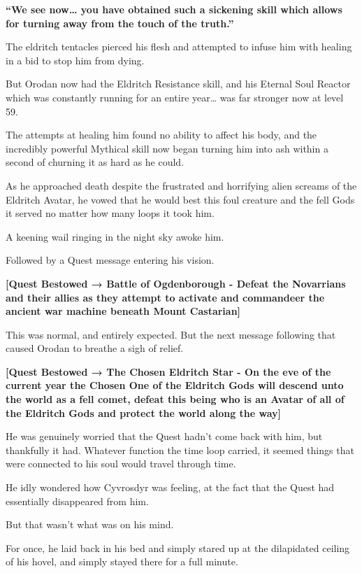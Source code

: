 \documentclass[a4paper,10pt]{book}
\begin{document}
\textbf{“We see now… you have obtained such a sickening skill which allows for turning away from the touch of the truth.”}\par
The eldritch tentacles pierced his flesh and attempted to infuse him with healing in a bid to stop him from dying.\par
But Orodan now had the Eldritch Resistance skill, and his Eternal Soul Reactor which was constantly running for an entire year… was far stronger now at level 59.\par
The attempts at healing him found no ability to affect his body, and the incredibly powerful Mythical skill now began turning him into ash within a second of churning it as hard as he could.\par
As he approached death despite the frustrated and horrifying alien screams of the Eldritch Avatar, he vowed that he would best this foul creature and the fell Gods it served no matter how many loops it took him.\par
\par
A keening wail ringing in the night sky awoke him.\par
Followed by a Quest message entering his vision.\par
\textbf{[Quest Bestowed → Battle of Ogdenborough - Defeat the Novarrians and their allies as they attempt to activate and commandeer the ancient war machine beneath Mount Castarian]}\par
This was normal, and entirely expected. But the next message following that caused Orodan to breathe a sigh of relief.\par
\textbf{[Quest Bestowed → The Chosen Eldritch Star - On the eve of the current year the Chosen One of the Eldritch Gods will descend unto the world as a fell comet, defeat this being who is an Avatar of all of the Eldritch Gods and protect the world along the way]}\par
He was genuinely worried that the Quest hadn’t come back with him, but thankfully it had. Whatever function the time loop carried, it seemed things that were connected to his soul would travel through time.\par
He idly wondered how Cyvrosdyr was feeling, at the fact that the Quest had essentially disappeared from him.\par
But that wasn’t what was on his mind.\par
For once, he laid back in his bed and simply stared up at the dilapidated ceiling of his hovel, and simply stayed there for a full minute.\par
\end{document}
